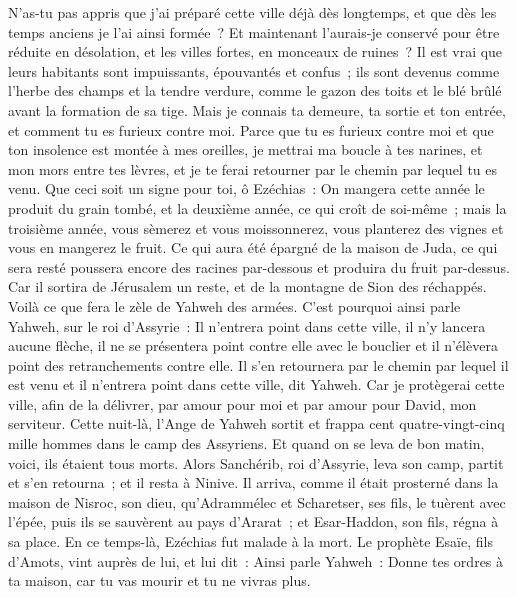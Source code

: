 \begin{multicols}{2}
N'as-tu pas appris que j'ai préparé cette ville déjà dès longtemps, et que dès les temps anciens je l'ai ainsi formée~? Et maintenant l'aurais-je conservé pour être réduite en désolation, et les villes fortes, en monceaux de ruines~?
Il est vrai que leurs habitants sont impuissants, épouvantés et confus~; ils sont devenus comme l'herbe des champs et la tendre verdure, comme le gazon des toits et le blé brûlé avant la formation de sa tige.
Mais je connais ta demeure, ta sortie et ton entrée, et comment tu es furieux contre moi.
Parce que tu es furieux contre moi et que ton insolence est montée à mes oreilles, je mettrai ma boucle à tes narines, et mon mors entre tes lèvres, et je te ferai retourner par le chemin par lequel tu es venu.
Que ceci soit un signe pour toi, ô Ezéchias~: On mangera cette année le produit du grain tombé, et la deuxième année, ce qui croît de soi-même~; mais la troisième année, vous sèmerez et vous moissonnerez, vous planterez des vignes et vous en mangerez le fruit.
Ce qui aura été épargné de la maison de Juda, ce qui sera resté poussera encore des racines par-dessous et produira du fruit par-dessus.
Car il sortira de Jérusalem un reste, et de la montagne de Sion des réchappés. Voilà ce que fera le zèle de Yahweh des armées.
C'est pourquoi ainsi parle Yahweh, sur le roi d'Assyrie~: Il n'entrera point dans cette ville, il n'y lancera aucune flèche, il ne se présentera point contre elle avec le bouclier et il n'élèvera point des retranchements contre elle.
Il s'en retournera par le chemin par lequel il est venu et il n'entrera point dans cette ville, dit Yahweh.
Car je protègerai cette ville, afin de la délivrer, par amour pour moi et par amour pour David, mon serviteur.
Cette nuit-là, l'Ange de Yahweh sortit et frappa cent quatre-vingt-cinq mille hommes dans le camp des Assyriens. Et quand on se leva de bon matin, voici, ils étaient tous morts.
Alors Sanchérib, roi d'Assyrie, leva son camp, partit et s'en retourna~; et il resta à Ninive.
Il arriva, comme il était prosterné dans la maison de Nisroc, son dieu, qu'Adrammélec et Scharetser, ses fils, le tuèrent avec l'épée, puis ils se sauvèrent au pays d'Ararat~; et Esar-Haddon, son fils, régna à sa place.
\VerseOne{}En ce temps-là, Ezéchias fut malade à la mort. Le prophète Esaïe, fils d'Amots, vint auprès de lui, et lui dit~: Ainsi parle Yahweh~: Donne tes ordres à ta maison, car tu vas mourir et tu ne vivras plus.

\end{multicols}
